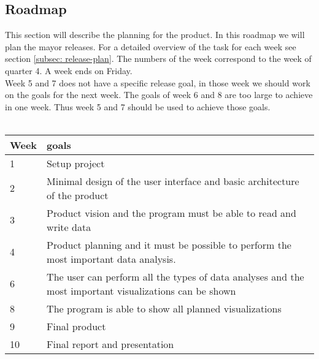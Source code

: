 \subsection{Roadmap}
\label{subsec: roadmap}
This section will describe the planning for the product. In this roadmap we will plan the mayor releases. For a detailed overview of the task for each week see section \ref{subsec: release-plan}. The numbers of the week correspond to the week of quarter 4. A week ends on Friday.\\
Week 5 and 7 does not have a specific release goal, in those week we should work on the goals for the next week. The goals of week 6 and 8 are too large to achieve in one week. Thus week 5 and 7 should be used to achieve those goals.\\\\
\begin{tabular}[H]{ l p{10cm} }
Week & goals \\
\hline
1 & Setup project \\
2 & Minimal design of the user interface and basic architecture of the product \\
3 & Product vision and the program must be able to read and write data\\
4 & Product planning and it must be possible to perform the most important data analysis. \\
6 & The user can perform all the types of data analyses and the most important visualizations can be shown \\
8 & The program is able to show all planned visualizations \\
9 & Final product \\
10 & Final report and presentation
\end{tabular}
